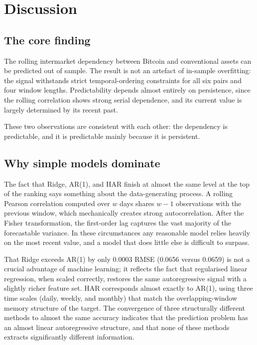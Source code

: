 \section{Discussion}
\label{sec:discussion}

\subsection{The core finding}

The rolling intermarket dependency between Bitcoin and conventional assets can be predicted out of sample. The result is not an artefact of in-sample overfitting: the signal withstands strict temporal-ordering constraints for all six pairs and four window lengths. Predictability depends almost entirely on persistence, since the rolling correlation shows strong serial dependence, and its current value is largely determined by its recent past.

These two observations are consistent with each other: the dependency is predictable, and it is predictable mainly because it is persistent.

\subsection{Why simple models dominate}

The fact that Ridge, AR(1), and HAR finish at almost the same level at the top of the ranking says something about the data-generating process. A rolling Pearson correlation computed over $w$ days shares $w-1$ observations with the previous window, which mechanically creates strong autocorrelation. After the Fisher transformation, the first-order lag captures the vast majority of the forecastable variance. In these circumstances any reasonable model relies heavily on the most recent value, and a model that does little else is difficult to surpass.

That Ridge exceeds AR(1) by only 0.0003 RMSE (0.0656 versus 0.0659) is not a crucial advantage of machine learning; it reflects the fact that regularised linear regression, when scaled correctly, restores the same autoregressive signal with a slightly richer feature set. HAR corresponds almost exactly to AR(1), using three time scales (daily, weekly, and monthly) that match the overlapping-window memory structure of the target. The convergence of three structurally different methods to almost the same accuracy indicates that the prediction problem has an almost linear autoregressive structure, and that none of these methods extracts significantly different information.

